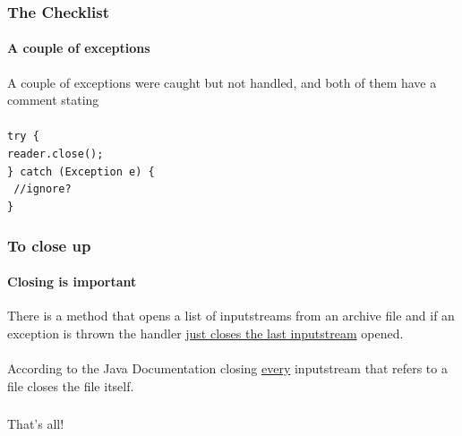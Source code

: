 \documentclass[10pt,xcolor={usenames,dvipsnames}]{beamer}
\begin{document}
\begin{frame}
	\frametitle{The Checklist}
	\framesubtitle{A couple of exceptions}
	A couple of exceptions were caught but not handled, and both of them have a comment stating\\
	\-\\
	\texttt{{\color{Blue}try }\{\\\-	reader.close();\\\} {\color{Blue}catch} (Exception e) \{\\{\color{Green}\-	//ignore?}\\\}}
\end{frame}

\begin{frame}
	\frametitle{To close up}
	\framesubtitle{Closing is important}
	There is a method that opens a list of inputstreams from an archive file and if an exception is thrown the handler \underline{just closes the last inputstream} opened.\\
	\-\\
	According to the Java Documentation closing \underline{every} inputstream that refers to a file closes the file itself.\\
\end{frame}
\begin{frame}
	\frametitle{}
	\framesubtitle{}
	{\huge
		\begin{center}
			That's all!
		\end{center}
	}
\end{frame}
\end{document}

